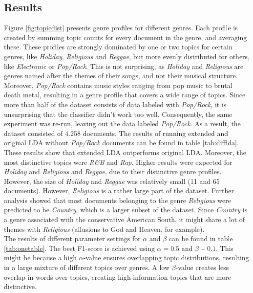 \subsection{Results}
Figure \ref{fig:topicdist} presents genre profiles for different genres. Each profile is created by summing topic counts for every document in the genre, and averaging these. These profiles are strongly dominated by one or two topics for certain genres, like \textit{Holiday}, \textit{Religious} and \textit{Reggae}, but more evenly distributed for others, like \textit{Electronic} or \textit{Pop/Rock}. This is not surprising, as \textit{Holiday} and \textit{Religious} are genres named after the themes of their songs, and not their musical structure. Moreover, \textit{Pop/Rock} contains music styles ranging from pop music to brutal death metal, resulting in a genre profile that covers a wide range of topics. Since more than half of the dataset consists of data labeled with \textit{Pop/Rock}, it is unsurprising that the classifier didn't work too well. 
Consequently, the same experiment was re-run, leaving out the data labeled \textit{Pop/Rock}. As a result, the dataset consisted of $4.258$ documents. The results of running extended and original LDA without \textit{Pop/Rock} documents can be found in table \ref{tab:difflda}. These results show that extended LDA outperforms original LDA. Moreover, the most distinctive topics were \textit{R\&B} and \textit{Rap}. Higher results were expected for \textit{Holiday} and \textit{Religious} and \textit{Reggae}, due to their distinctive genre profiles. However, the size of \textit{Holiday} and \textit{Reggae} was relatively small (11 and 65 documents). However, \textit{Religious} is a rather large part of the dataset. Further analysis showed that most documents belonging to the genre \textit{Religious} were predicted to be \textit{Country}, which is a larger subset of the dataset. Since \textit{Country} is a genre associated with the conservative American South, it might share a lot of themes with \textit{Religious} (allusions to God and Heaven, for example). \\
The results of different parameter settings for $\alpha$ and $\beta$ can be found in table \ref{tab:onetable}. The best F1-score is achieved using $\alpha=0.5$ and $\beta-0.1$. This might be because a high $\alpha$-value ensures overlapping topic distributions, resulting in a large mixture of different topics over genres. A low $\beta$-value creates less overlap in words over topics, creating high-information topics that are more distinctive.\\
